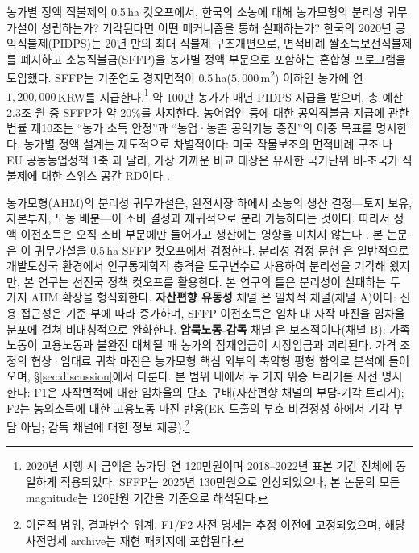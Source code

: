 \documentclass[12pt, a4paper]{article}
\begin{document}
농가별 정액 직불제의 0.5\,ha 컷오프에서, 한국의 소농에 대해 농가모형의 분리성 귀무가설이 성립하는가? 기각된다면 어떤 메커니즘을 통해 실패하는가? 한국의 2020년 공익직불제(PIDPS)는 20년 만의 최대 직불제 구조개편으로, 면적비례 쌀소득보전직불제를 폐지하고 소농직불금(SFFP)을 농가별 정액 부문으로 포함하는 혼합형 프로그램을 도입했다. SFFP는 기준연도 경지면적이 0.5\,ha($5{,}000$\,m\textsuperscript{2}) 이하인 농가에 연 $1{,}200{,}000$\,KRW를 지급한다.\footnote{2020년 시행 시 금액은 농가당 연 120만원이며 2018--2022년 표본 기간 전체에 동일하게 적용되었다. SFFP는 2025년 130만원으로 인상되었으나, 본 논문의 모든 magnitude는 120만원 기간을 기준으로 해석된다.} 약 100만 농가가 매년 PIDPS 지급을 받으며, 총 예산 2.3조 원 중 SFFP가 약 20\%를 차지한다. 농어업인 등에 대한 공익직불금 지급에 관한 법률 제10조는 ``농가 소득 안정''과 ``농업·농촌 공익기능 증진''의 이중 목표를 명시한다. 농가별 정액 설계는 제도적으로 차별적이다: 미국 작물보조의 면적비례 구조 \citep{Kirwan2009_rentcap}나 EU 공동농업정책 1축 \citep{BaldoniCiaian2023_eucap}과 달리, 가장 가까운 비교 대상은 유사한 국가단위 비-초국가 직불제에 대한 스위스 공간 RD이다 \citep{ZimmertZorn2022_swissrd}.

농가모형(AHM)의 분리성 귀무가설은, 완전시장 하에서 소농의 생산 결정---토지 보유, 자본투자, 노동 배분---이 소비 결정과 재귀적으로 분리 가능하다는 것이다. 따라서 정액 이전소득은 오직 소비 부문에만 들어가고 생산에는 영향을 미치지 않는다 \citep{SinghSquireStrauss1986_ahm, deJanvryFafchampsSadoulet1991_peasant}. 본 논문은 이 귀무가설을 0.5\,ha SFFP 컷오프에서 검정한다. 분리성 검정 문헌 \citep{Benjamin1992_separation, LaFaveThomas2016_markets}은 일반적으로 개발도상국 환경에서 인구통계학적 충격을 도구변수로 사용하여 분리성을 기각해 왔지만, 본 연구는 선진국 정책 컷오프를 활용한다. 본 연구의 틀은 분리성이 실패하는 두 가지 AHM 확장을 형식화한다. \textbf{자산편향 유동성} 채널 \citep{CarterOlinto2003_liquidity}은 일차적 채널(채널 A)이다: 신용 접근성은 기준 부에 따라 증가하며, SFFP 이전소득은 임차 대 자작 마진을 임차율 분포에 걸쳐 비대칭적으로 완화한다. \textbf{암묵노동-감독} 채널 \citep{EswaranKotwal1986_supervision}은 보조적이다(채널 B): 가족노동이 고용노동과 불완전 대체될 때 농가의 잠재임금이 시장임금과 괴리된다. 가격 조정의 협상·임대료 귀착 마진은 농가모형 핵심 외부의 축약형 평형 함의로 분석에 들어오며, \S\ref{sec:discussion}에서 다룬다. 본 범위 내에서 두 가지 위증 트리거를 사전 명시한다: F1은 자작면적에 대한 임차율의 단조 구배(자산편향 채널의 부담-기각 트리거); F2는 농외소득에 대한 고용노동 마진 반응(EK 도출의 부호 비결정성 하에서 기각-부담 아님; 감독 채널에 대한 정보 제공).\footnote{이론적 범위, 결과변수 위계, F1/F2 사전 명세는 추정 이전에 고정되었으며, 해당 사전명세 archive는 재현 패키지에 포함된다.}
\end{document}
